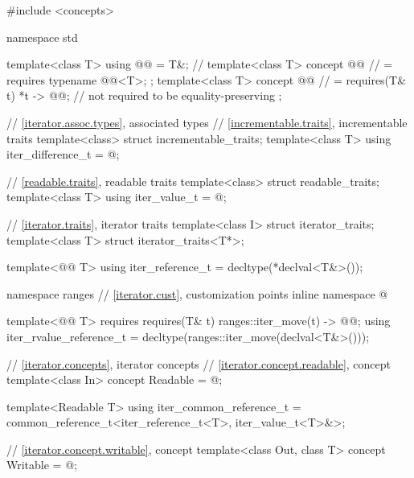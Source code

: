 %
%
%
\begin{codeblock}
#include <concepts>

namespace std {
  template<class T> using @@ = T&;  // \expos
  template<class T> concept @@       // \expos
    = requires { typename @@<T>; };
  template<class T> concept @@     // \expos
    = requires(T& t) {
      { *t } -> @@;  // not required to be equality-preserving
    };

  // \ref{iterator.assoc.types}, associated types
  // \ref{incrementable.traits}, incrementable traits
  template<class> struct incrementable_traits;
  template<class T>
    using iter_difference_t = @\seebelow@;

  // \ref{readable.traits}, readable traits
  template<class> struct readable_traits;
  template<class T>
    using iter_value_t = @\seebelow@;

  // \ref{iterator.traits}, iterator traits
  template<class I> struct iterator_traits;
  template<class T> struct iterator_traits<T*>;

  template<@@ T>
    using iter_reference_t = decltype(*declval<T&>());

  namespace ranges {
    // \ref{iterator.cust}, customization points
    inline namespace @
  }

  template<@@ T>
    requires requires(T& t) {
      { ranges::iter_move(t) } -> @@;
    }
  using iter_rvalue_reference_t
    = decltype(ranges::iter_move(declval<T&>()));

  // \ref{iterator.concepts}, iterator concepts
  // \ref{iterator.concept.readable}, concept 
  template<class In>
    concept Readable = @\seebelow@;

  template<Readable T>
    using iter_common_reference_t =
      common_reference_t<iter_reference_t<T>, iter_value_t<T>&>;

  // \ref{iterator.concept.writable}, concept 
  template<class Out, class T>
    concept Writable = @\seebelow@;

}
\end{codeblock}
